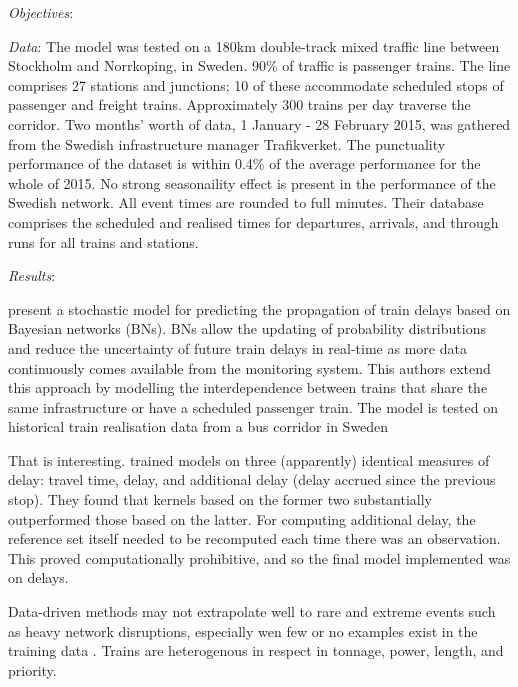 \documentclass{article}
\begin{document}
\textit{Objectives}: 

\textit{Data}: The model was tested on a 180km double-track mixed traffic line between Stockholm and Norrkoping, in Sweden. 90\% of traffic is passenger trains. The line comprises 27 stations and junctions; 10 of these accommodate scheduled stops of passenger and freight trains. Approximately 300 trains per day traverse the corridor. Two months' worth of data, 1 January - 28 February 2015, was gathered from the Swedish infrastructure manager Trafikverket. The punctuality performance of the dataset is within 0.4\% of the average performance for the whole of 2015. No strong seasonaility effect is present in the performance of the Swedish network. All event times are rounded to full minutes. Their database comprises the scheduled and realised times for departures, arrivals, and through runs for all trains and stations. 

\textit{Results}:

present a stochastic model for predicting the propagation of train delays based on Bayesian networks (BNs). BNs allow the updating of probability distributions and reduce the uncertainty of future train delays in real-time as more data continuously comes available from the monitoring system. This authors extend this approach by modelling the interdependence between trains that share the same infrastructure or have a scheduled passenger train. The model is tested on historical train realisation data from a bus corridor in Sweden

That is interesting. \cite{nair_et_al_2019} trained models on three (apparently) identical measures of delay: travel time, delay, and additional delay (delay accrued since the previous stop). They found that kernels based on the former two substantially outperformed those based on the latter. For computing additional delay, the reference set itself needed to be recomputed each time there was an observation. This proved computationally prohibitive, and so the final model implemented was on delays.

Data-driven methods may not extrapolate well to rare and extreme events such as heavy network disruptions, especially wen few or no examples exist in the training data \cite{barbour_et_al_2019}.
Trains are heterogenous in respect in tonnage, power, length, and priority. 
\end{document}
